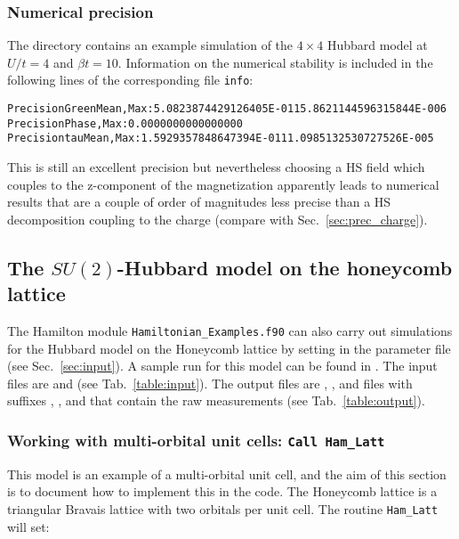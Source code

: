 \documentclass{SciPost}
\begin{document}
%
\subsubsection{Numerical precision}\label{sec:prec_spin}
%
The directory   contains an example simulation of the $4 \times 4$ Hubbard model at $U/t=4$ and $\beta t = 10$. 
Information on the numerical stability is included in the following lines of the corresponding file \texttt{info}:
 \begin{alltt}
Precision Green  Mean, Max : 5.0823874429126405E-011  5.8621144596315844E-006
Precision Phase, Max       : 0.0000000000000000     
Precision tau    Mean, Max : 1.5929357848647394E-011  1.0985132530727526E-005 
\end{alltt}

This is still an excellent precision but nevertheless choosing a 
 HS field which couples to the z-component of the magnetization apparently leads to numerical results that are 
a couple of order of magnitudes less precise than a HS decomposition coupling to the charge (compare with Sec.~\ref{sec:prec_charge}).

%
\subsection{The $SU(2)$-Hubbard model on  the honeycomb  lattice}\label{sec:walk1.2}
%
The Hamilton module \texttt{Hamiltonian\_Examples.f90}   can also carry out simulations for the Hubbard model on the Honeycomb lattice by setting in the parameter file    (see Sec.~\ref{sec:input}).
 A sample run for this model can be found in .
The input files are  and  (see Tab.~\ref{table:input}). The output files are , , and files with suffixes , , and  that 
contain the raw measurements (see Tab.~\ref{table:output}).
%
\subsubsection{Working with multi-orbital unit cells:  \texttt{Call Ham\_Latt} } \label{sec:multi-orbital}
%
  This model is an example of  a multi-orbital unit cell, and the aim of this section is to document how to implement this in the code.  The  Honeycomb lattice is a  triangular Bravais lattice with two orbitals per unit cell.  The routine  \texttt{Ham\_Latt} will set: 
\end{document}
